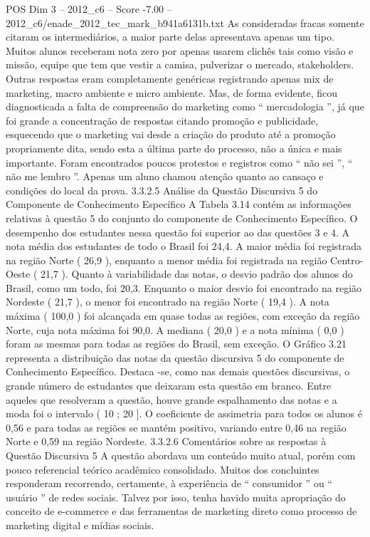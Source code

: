 \begin{textsample}{POS Dim 3 – 2012\_c6 – Score -7.00 – 2012\_c6/enade\_2012\_tec\_mark\_b941a6131b.txt}
As consideradas fracas somente citaram os intermediários, a maior parte delas apresentava apenas um tipo.
Muitos alunos receberam nota zero por apenas usarem clichês tais como visão e missão, equipe que tem que vestir a camisa, pulverizar o mercado, stakeholders.
Outras respostas eram completamente genéricas registrando apenas mix de marketing, macro ambiente e micro ambiente.
Mas, de forma evidente, ficou diagnosticada a falta de compreensão do marketing como “ mercadologia ”, já que foi grande a concentração de respostas citando promoção e publicidade, esquecendo que o marketing vai desde a criação do produto até a promoção propriamente dita, sendo esta a última parte do processo, não a única e mais importante.
Foram encontrados poucos protestos e registros como “ não sei ”, “ não me lembro ”.
Apenas um aluno chamou atenção quanto ao cansaço e condições do local da prova. 3.3.2.5 Análise da Questão Discursiva 5 do Componente de Conhecimento Específico A Tabela 3.14 contém as informações relativas à questão 5 do conjunto do componente de Conhecimento Específico.
O desempenho dos estudantes nessa questão foi superior ao das questões 3 e 4.
A nota média dos estudantes de todo o Brasil foi 24,4.
A maior média foi registrada na região Norte ( 26,9 ), enquanto a menor média foi registrada na região Centro-Oeste ( 21,7 ).
Quanto à variabilidade das notas, o desvio padrão dos alunos do Brasil, como um todo, foi 20,3.
Enquanto o maior desvio foi encontrado na região Nordeste ( 21,7 ), o menor foi encontrado na região Norte ( 19,4 ).
A nota máxima ( 100,0 ) foi alcançada em quase todas as regiões, com exceção da região Norte, cuja nota máxima foi 90,0.
A mediana ( 20,0 ) e a nota mínima ( 0,0 ) foram as mesmas para todas as regiões do Brasil, sem exceção.
O Gráfico 3.21 representa a distribuição das notas da questão discursiva 5 do componente de Conhecimento Específico.
Destaca -se, como nas demais questões discursivas, o grande número de estudantes que deixaram esta questão em branco.
Entre aqueles que resolveram a questão, houve grande espalhamento das notas e a moda foi o intervalo ( 10 ; 20 ].
O coeficiente de assimetria para todos os alunos é 0,56 e para todas as regiões se mantém positivo, variando entre 0,46 na região Norte e 0,59 na região Nordeste. 3.3.2.6 Comentários sobre as respostas à Questão Discursiva 5 A questão abordava um conteúdo muito atual, porém com pouco referencial teórico acadêmico consolidado.
Muitos dos concluintes responderam recorrendo, certamente, à experiência de “ consumidor ” ou “ usuário ” de redes sociais.
Talvez por isso, tenha havido muita apropriação do conceito de e-commerce e das ferramentas de marketing direto como processo de marketing digital e mídias sociais.

\end{textsample}
